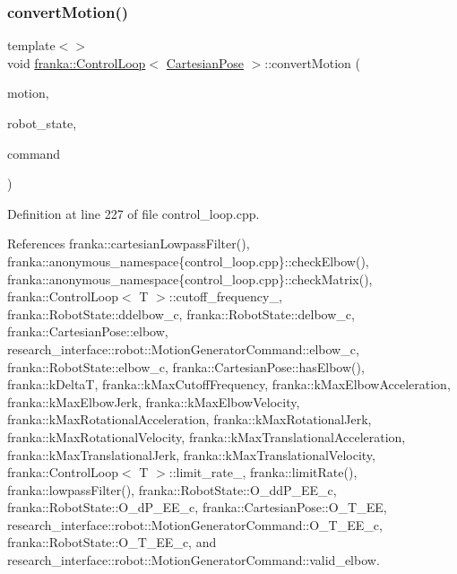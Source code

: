 \mbox{\label{classfranka_1_1ControlLoop_a1b12d574fd73dfeab9d44cc662435fb6}} 
\subsubsection{\texorpdfstring{convert\+Motion()}{convertMotion()}\hspace{0.1cm}{\footnotesize\ttfamily [4/5]}}
{\footnotesize\ttfamily template$<$$>$ \\
void \hyperlink{classfranka_1_1ControlLoop}{franka\+::\+Control\+Loop}$<$ \hyperlink{classfranka_1_1CartesianPose}{Cartesian\+Pose} $>$\+::convert\+Motion (\begin{DoxyParamCaption}\item[{const \hyperlink{classfranka_1_1CartesianPose}{Cartesian\+Pose} \&}]{motion,  }\item[{const \hyperlink{structfranka_1_1RobotState}{Robot\+State} \&}]{robot\+\_\+state,  }\item[{\hyperlink{structresearch__interface_1_1robot_1_1MotionGeneratorCommand}{research\+\_\+interface\+::robot\+::\+Motion\+Generator\+Command} $\ast$}]{command }\end{DoxyParamCaption})\hspace{0.3cm}{\ttfamily [private]}}



Definition at line 227 of file control\+\_\+loop.\+cpp.



References franka\+::cartesian\+Lowpass\+Filter(), franka\+::anonymous\+\_\+namespace\{control\+\_\+loop.\+cpp\}\+::check\+Elbow(), franka\+::anonymous\+\_\+namespace\{control\+\_\+loop.\+cpp\}\+::check\+Matrix(), franka\+::\+Control\+Loop$<$ T $>$\+::cutoff\+\_\+frequency\+\_\+, franka\+::\+Robot\+State\+::ddelbow\+\_\+c, franka\+::\+Robot\+State\+::delbow\+\_\+c, franka\+::\+Cartesian\+Pose\+::elbow, research\+\_\+interface\+::robot\+::\+Motion\+Generator\+Command\+::elbow\+\_\+c, franka\+::\+Robot\+State\+::elbow\+\_\+c, franka\+::\+Cartesian\+Pose\+::has\+Elbow(), franka\+::k\+DeltaT, franka\+::k\+Max\+Cutoff\+Frequency, franka\+::k\+Max\+Elbow\+Acceleration, franka\+::k\+Max\+Elbow\+Jerk, franka\+::k\+Max\+Elbow\+Velocity, franka\+::k\+Max\+Rotational\+Acceleration, franka\+::k\+Max\+Rotational\+Jerk, franka\+::k\+Max\+Rotational\+Velocity, franka\+::k\+Max\+Translational\+Acceleration, franka\+::k\+Max\+Translational\+Jerk, franka\+::k\+Max\+Translational\+Velocity, franka\+::\+Control\+Loop$<$ T $>$\+::limit\+\_\+rate\+\_\+, franka\+::limit\+Rate(), franka\+::lowpass\+Filter(), franka\+::\+Robot\+State\+::\+O\+\_\+dd\+P\+\_\+\+E\+E\+\_\+c, franka\+::\+Robot\+State\+::\+O\+\_\+d\+P\+\_\+\+E\+E\+\_\+c, franka\+::\+Cartesian\+Pose\+::\+O\+\_\+\+T\+\_\+\+EE, research\+\_\+interface\+::robot\+::\+Motion\+Generator\+Command\+::\+O\+\_\+\+T\+\_\+\+E\+E\+\_\+c, franka\+::\+Robot\+State\+::\+O\+\_\+\+T\+\_\+\+E\+E\+\_\+c, and research\+\_\+interface\+::robot\+::\+Motion\+Generator\+Command\+::valid\+\_\+elbow.



